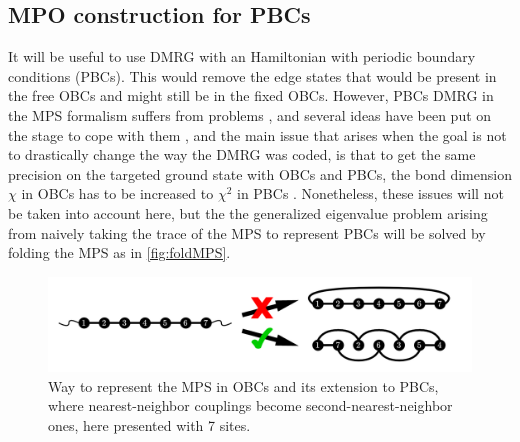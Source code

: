 	\subsection{MPO construction for PBCs}

		It will be useful to use DMRG with an Hamiltonian with periodic boundary conditions (PBCs). This would remove the edge states that would be present in the free OBCs and might still be in the fixed OBCs. However, PBCs DMRG in the MPS formalism suffers from problems \cite{schollwoeck2011}, and several ideas have been put on the stage to cope with them \cite{dey2016, pippan2010, verstraete2004, pirvu2011}, and the main issue that arises when the goal is not to drastically change the way the DMRG was coded, is that to get the same precision on the targeted ground state with OBCs and PBCs, the bond dimension $\chi$ in OBCs has to be increased to $\chi^2$ in PBCs \cite{schollwoeck2011}. Nonetheless, these issues will not be taken into account here, but the the generalized eigenvalue problem arising from naively taking the trace of the MPS to represent PBCs will be solved by folding the MPS as in \autoref{fig:foldMPS}.

		\begin{figure}[h!]
			\centering
			\includegraphics[scale=0.4]{../images/pbcmps.png}
			\caption{Way to represent the MPS in OBCs and its extension to PBCs, where nearest-neighbor couplings become second-nearest-neighbor ones, here presented with 7 sites.}
			\label{fig:foldMPS}
		\end{figure}

